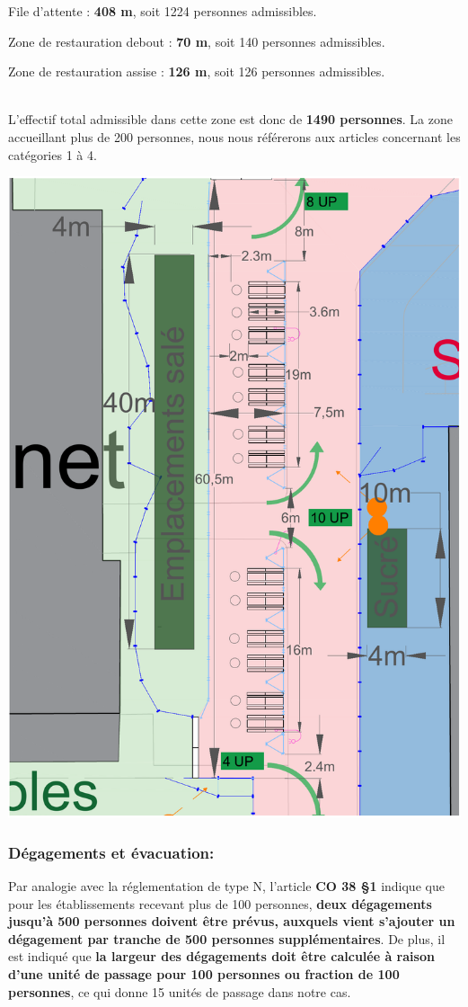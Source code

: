 \documentclass[hidelinks, paper=a4, fontsize=13pt]{report}
\begin{document}
\begin{list}{•}{}
	\item File d'attente : \textbf{408 m}, soit 1224 personnes admissibles.
	\item Zone de restauration debout : \textbf{70 m}, soit 140 personnes admissibles.
	\item Zone de restauration assise : \textbf{126 m}, soit 126 personnes admissibles.
\end{list} \mbox{}\\

L'effectif total admissible dans cette zone est donc de \textbf{1490 personnes}. La zone accueillant plus de 200 personnes, nous nous référerons aux articles concernant les catégories 1 à 4. \\

\begin{center}
	\includegraphics[width=.8\textwidth,keepaspectratio]{Exports/Plan_24h_44eme-Espace_Resto_Cotes}
\end{center}

\subsubsection{Dégagements et évacuation:}
Par analogie avec la réglementation de type N, l’article \textbf{CO 38 §1} indique que pour les établissements recevant plus de 100 personnes, \textbf{deux dégagements jusqu’à 500 personnes doivent être prévus, auxquels vient s'ajouter un dégagement par tranche de 500 personnes supplémentaires}. De plus, il est indiqué que \textbf{la largeur des dégagements doit être calculée à raison d'une unité de passage pour 100 personnes ou fraction de 100 personnes}, ce qui donne 15 unités de passage dans notre cas. \\
\end{document}
